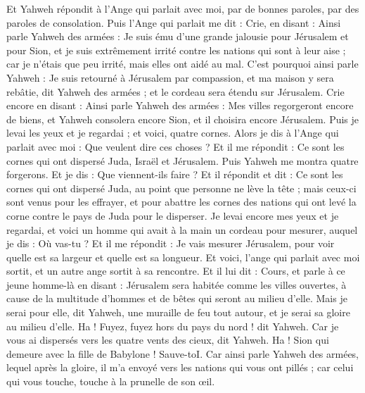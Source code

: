 \begin{multicols}{2}
Et Yahweh répondit à l'Ange qui parlait avec moi, par de bonnes paroles, par des paroles de consolation.
Puis l'Ange qui parlait me dit : Crie, en disant : Ainsi parle Yahweh des armées : Je suis ému d'une grande jalousie pour Jérusalem et pour Sion,
et je suis extrêmement irrité contre les nations qui sont à leur aise ; car je n'étais que peu irrité, mais elles ont aidé au mal.
C'est pourquoi ainsi parle Yahweh : Je suis retourné à Jérusalem par compassion, et ma maison y sera rebâtie, dit Yahweh des armées ; et le cordeau sera étendu sur Jérusalem.
Crie encore en disant : Ainsi parle Yahweh des armées : Mes villes regorgeront encore de biens, et Yahweh consolera encore Sion, et il choisira encore Jérusalem.
Puis je levai les yeux et je regardai ; et voici, quatre cornes.
Alors je dis à l'Ange qui parlait avec moi : Que veulent dire ces choses ? Et il me répondit : Ce sont les cornes qui ont dispersé Juda, Israël et Jérusalem.
Puis Yahweh me montra quatre forgerons.
Et je dis : Que viennent-ils faire ? Et il répondit et dit : Ce sont les cornes qui ont dispersé Juda, au point que personne ne lève la tête ; mais ceux-ci sont venus pour les effrayer, et pour abattre les cornes des nations qui ont levé la corne contre le pays de Juda pour le disperser.
\VerseOne{}Je levai encore mes yeux et je regardai, et voici un homme qui avait à la main un cordeau pour mesurer,
auquel je dis : Où vas-tu ? Et il me répondit : Je vais mesurer Jérusalem, pour voir quelle est sa largeur et quelle est sa longueur.
Et voici, l'ange qui parlait avec moi sortit, et un autre ange sortit à sa rencontre.
Et il lui dit : Cours, et parle à ce jeune homme-là en disant : Jérusalem sera habitée comme les villes ouvertes, à cause de la multitude d'hommes et de bêtes qui seront au milieu d'elle.
Mais je serai pour elle, dit Yahweh, une muraille de feu tout autour, et je serai sa gloire au milieu d'elle.
Ha ! Fuyez, fuyez hors du pays du nord ! dit Yahweh. Car je vous ai dispersés vers les quatre vents des cieux, dit Yahweh.
Ha ! Sion qui demeure avec la fille de Babylone ! Sauve-toI.
Car ainsi parle Yahweh des armées, lequel après la gloire, il m'a envoyé vers les nations qui vous ont pillés ; car celui qui vous touche, touche à la prunelle de son œil.

\end{multicols}
